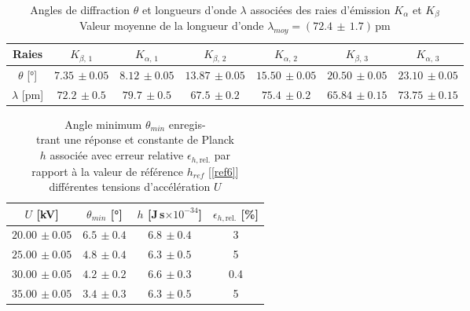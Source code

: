 \documentclass[a4paper, 12pt,oneside]{article}
\begin{document}
\begin{table}[h]
\centering
\begin{tabular}{|c||c|c|c|c|c|c|}
\hline
Raies & $K_{\beta ,\,1}$ & $K_{\alpha ,\,1}$ & $K_{\beta ,\,2}$ & $K_{\alpha ,\,2}$ & $K_{\beta ,\,3}$ & $K_{\alpha ,\,3}$ \\
\hline
$\theta$ [°] & $7.35\,\pm 0.05$ & $8.12\,\pm 0.05$ & $13.87\,\pm 0.05$ & $15.50\,\pm 0.05$ & $20.50\,\pm 0.05$ & $23.10\,\pm 0.05$ \\
\hline
$\lambda$ [pm] & $72.2\,\pm 0.5$ & $79.7\,\pm 0.5$ & $67.5\,\pm 0.2$ & $75.4\,\pm 0.2$ & $65.84\,\pm 0.15$& $73.75\,\pm 0.15$ \\
\hline
\end{tabular}
\captionsetup{justification=centering}
\caption{Angles de diffraction $\theta$ et longueurs d'onde $\lambda$ associées des raies d'émission $K_\alpha$ et $K_\beta$\\
Valeur moyenne de la longueur d'onde $\lambda_{moy} = (72.4\,\pm\,1.7)\,$pm}
\label{tab1}
\end{table}

\begin{table}[h]
\begin{tabular}{|c|c|c|c|}
\hline
$U$ [kV] & $\theta_{min}$ [°]  & $h$ [J$\,$s$\times 10^{-34}$] & $\epsilon_{h,\text{rel.}}$ [\%] \\
\hline
\hline
$20.00\,\pm 0.05$& $6.5\,\pm 0.4$ & $6.8\,\pm 0.4$ & 3 \\
\hline
$25.00\,\pm 0.05$& $4.8\,\pm 0.4$ & $6.3\,\pm 0.5$ & 5 \\
\hline
$30.00\,\pm 0.05$& $4.2\,\pm 0.2$ & $6.6\,\pm 0.3$ & 0.4 \\
\hline
$35.00\,\pm 0.05$& $3.4\,\pm 0.3$ & $6.3\,\pm 0.5$ & 5 \\
\hline
\end{tabular}
\captionsetup{justification=raggedleft}
\vspace{-3cm}
\caption{Angle minimum $\theta_{min}$ enregis-\\trant une réponse et constante de Planck \\$h$ associée avec erreur relative $\epsilon_{h,\text{rel.}}$ par\\rapport à la valeur de référence $h_{ref}$ [\ref{ref6}]\\ différentes tensions d'accélération $U$}
\label{tab2}
\end{table}
\vspace{-0.4cm}
\end{document}
